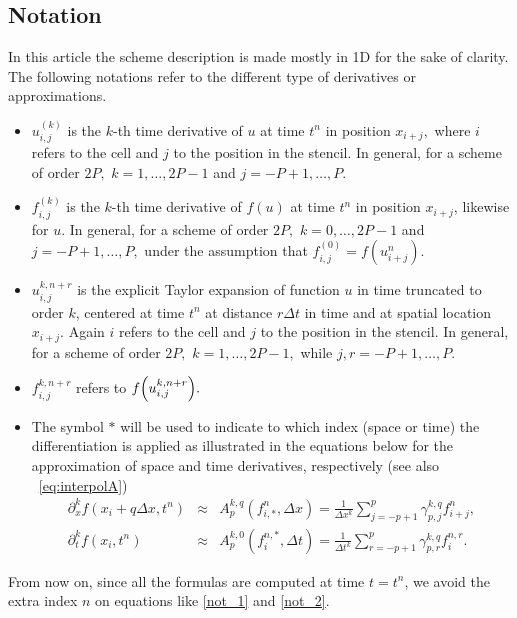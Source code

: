 \subsection{Notation}
In this article the scheme description is made mostly in 1D for the sake of clarity.
The following notations refer to
the different type of derivatives or approximations.
\begin{itemize}
    \item $u_{i,j}^{(k)}$ is the $k$-th time derivative of $u$ at time $t^n$ in position $x_{i+j},$ where $i$ refers to the cell and $j$ to the position in the stencil. In general, for a scheme of order $2P,$ $k = 1,\ldots,2P-1$ and $j = -P+1,\ldots,P.$

    \item $f_{i,j}^{(k)}$ is the $k$-th time derivative of $f(u)$ at time $t^n$ in position $x_{i+j}$, likewise for $u$. %
    In general, for a scheme of order $2P,$ $k = 0,\ldots,2P-1$ and $j = -P+1,\ldots,P,$ under the assumption that $f_{i,j}^{(0)} = f(u_{i+j}^{n})$.

    \item $u_{i,j}^{k,n+r}$ is the explicit Taylor expansion of function $u$ in time truncated to order $k$,  centered at time $t^n$ at distance $r\Delta t$ in time and at spatial location $x_{i+j}$. Again $i$ refers to the cell and $j$ to the position in the stencil. In general, for a scheme of order $2P,$ $k = 1,\ldots,2P-1,$ while $j,r = -P+1,\ldots,P.$

    \item $f_{i,j}^{k,n+r}$ refers to $f\Bigl(u_{i,j}^{k,n+r}\Bigr).$

    \item The symbol $*$ will be used to indicate to which index (space or time) the differentiation is applied as illustrated in the equations below for the approximation of space and time derivatives, respectively (see also ~\eqref{eq:interpolA})
    \begin{eqnarray}
            \label{not_1}
            \partial_x^kf(x_i+q\Delta x,t^n) &\approx& A^{k,q}_{p}(f_{i,*}^n, \Delta x)   =   \frac{1}{\Delta x^k} \sum_{j=-p+1}^{p} \gamma^{k,q}_{p,j} f^n_{i+j}, \\
            \label{not_2}
            \partial_t^kf(x_i,t^n) &\approx& A^{k,0}_{p}(f^{n,*}_i, \Delta t)   =   \frac{1}{\Delta t^k} \sum_{r=-p+1}^{p} \gamma^{k,q}_{p,r} f^{n,r}_{i}.
        \end{eqnarray}
\end{itemize}
From now on, since all the formulas are computed at time $t=t^n$, we avoid the extra index $n$ on equations like \eqref{not_1} and \eqref{not_2}.